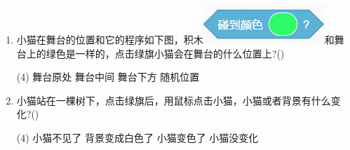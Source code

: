 \documentclass[10pt, a4paper]{article}
\begin{document}
\begin{enumerate}
        \newpage
        \item 小猫在舞台的位置和它的程序如下图，积木\includegraphics[width=.1\textwidth]{8-2.png}和舞台上的绿色是一样的，点击绿旗小猫会在舞台的什么位置上?(\qquad)
        \begin{tasks}(4)
            \task 舞台原处
            \task 舞台中间
            \task 舞台下方
            \task 随机位置
        \end{tasks}

        \item 小猫站在一棵树下，点击绿旗后，用鼠标点击小猫，小猫或者背景有什么变化?(\qquad)
        \begin{tasks}(4)
            \task 小猫不见了
            \task 背景变成白色了
            \task 小猫变色了
            \task 小猫没变化
        \end{tasks}


\end{enumerate}
\end{document}
